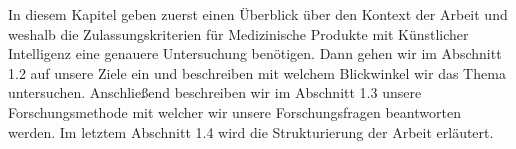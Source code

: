 In diesem Kapitel geben zuerst einen Überblick über den Kontext der Arbeit und weshalb die Zulassungskriterien für Medizinische Produkte mit Künstlicher Intelligenz eine genauere Untersuchung benötigen. Dann gehen wir im Abschnitt 1.2 auf unsere Ziele ein und beschreiben mit welchem Blickwinkel wir das Thema untersuchen. Anschließend beschreiben wir im Abschnitt 1.3 unsere Forschungsmethode mit welcher wir unsere Forschungsfragen beantworten werden. Im letztem Abschnitt 1.4 wird die Strukturierung der Arbeit erläutert.